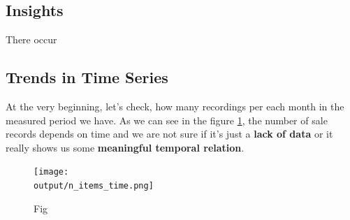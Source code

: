 \documentclass[12pt,twoside,a4paper]{memoir}
\def \output {../output}
\begin{document}
\subsection{Insights}
There occur 

\subsection{Trends in Time Series}

At the very beginning, let's check, how many recordings per each month in the measured period we have. As we can see in the figure \ref{fig:nRecords}, the number of sale records depends on time and we are not sure if it's just a \textbf{lack of data} or it really shows us some \textbf{meaningful temporal relation}.


	\begin{figure}[ht]
		\centering
		\texttt{[image: \\output/n\_items\_time.png]}
		\caption{Fig}
	\label{fig:nRecords}
	\end{figure}






\printbibliography
\end{document}
